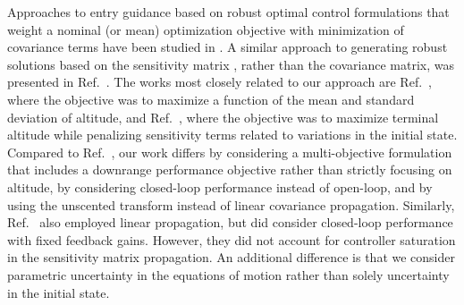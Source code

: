 \documentclass[journal ]{new-aiaa}
\begin{document}
Approaches to entry guidance based on robust optimal control formulations that weight a nominal (or mean) optimization objective with minimization of covariance terms have been studied in \cite{AltitudeUnderUncertainty, EntryOUUThesis1, EntryOUUThesis2, EntryOUU}. A similar approach to generating robust solutions based on the sensitivity matrix \cite{Desensitized}, rather than the covariance matrix, was presented in Ref.~\cite{MarsEntryDesensitized}. 
The works most closely related to our approach are Ref.~\cite{AltitudeUnderUncertainty}, where the objective was to maximize a function of the mean and standard deviation of altitude, and Ref.~\cite{MarsEntryDesensitized}, where the objective was to maximize terminal altitude while penalizing sensitivity terms related to variations in the initial state. Compared to Ref.~\cite{AltitudeUnderUncertainty}, our work differs by considering a multi-objective formulation that includes a downrange performance objective rather than strictly focusing on altitude, by considering closed-loop performance instead of open-loop, and by using the unscented transform instead of linear covariance propagation. Similarly, Ref.~\cite{MarsEntryDesensitized} also employed linear propagation, but did consider closed-loop performance with fixed feedback gains. However, they did not account for controller saturation in the sensitivity matrix propagation. An additional difference is that we consider parametric uncertainty in the equations of motion rather than solely uncertainty in the initial state. 


\end{document}
